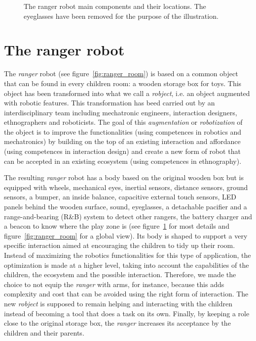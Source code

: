 \documentclass{sig-alternate}
\begin{document}
\begin{figure}
\begin{tikzpicture}[
        >=latex,
        scale=1]
    \end{tikzpicture}

    \caption{The ranger robot main components and their locations. The eyeglasses
    have been removed for the purpose of the illustration.}

    \label{fig:ranger_c} 
\end{figure}

\section{The ranger robot}
\label{sec:ranger} 

The \textit{ranger} robot (see figure~\ref{fig:ranger_room}) is based on a
common object that can be found in every children room: a wooden storage box for
toys.  This object has been transformed into what we call a \textit{robject},
i.e. an object augmented with robotic features.  This transformation has beed
carried out by an interdisciplinary team including mechatronic engineers,
interaction designers, ethnographers and roboticists.  The goal of this
\textit{augmentation} or \textit{robotization} of the object is to improve the
functionalities (using competences in robotics and mechatronics) by building on
the top of an existing interaction and affordance (using competences in
interaction design) and create a new form of robot that can be accepted in an
existing ecosystem (using competences in ethnography).

The resulting \textit{ranger} robot has a body based on the original wooden box
but is equipped with wheels, mechanical eyes, inertial sensors, distance
sensors, ground sensors, a bumper, an inside balance, capacitive external touch
sensors, LED panels behind the wooden surface, sound, eyeglasses, a detachable
pacifier and a range-and-bearing (R\&B) system to detect other rangers, the
battery charger and a beacon to know where the play zone is (see
figure~\ref{fig:ranger_c} for most details and figure~\ref{fig:ranger_room} for
a global view).  Its body is shaped to support a very specific interaction aimed
at encouraging the children to tidy up their room.  Instead of maximizing the
robotics functionalities for this type of application, the optimization is made
at a higher level, taking into account the capabilities of the children, the
ecosystem and the possible interaction.  Therefore, we made the choice to not
equip the \textit{ranger} with arms, for instance, because this adds complexity
and cost that can be avoided using the right form of interaction.  The new
\textit{robject}  is supposed to remain helping and interacting with the
children instead of becoming a tool that does a task on its own.  Finally, by
keeping a role close to the original storage box, the \textit{ranger} increases
its acceptance by the children and their parents.
\end{document}

